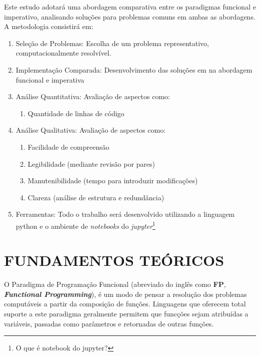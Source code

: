 \documentclass[date,twocolumn,a4paper]{ppgem}
\begin{document}
    Este estudo adotará uma abordagem comparativa entre os paradigmas funcional e imperativo, analisando soluções para problemas comuns em ambas as abordagens. A metodologia consistirá em:
    \begin{enumerate}
        \item Seleção de Problemas: Escolha de um problema representativo, computacionalmente resolvível.
        \item Implementação Comparada: Desenvolvimento das soluções em na abordagem funcional e imperativa
        \item Análise Quantitativa: Avaliação de aspectos como:
        \begin{enumerate}
            \item Quantidade de linhas de código
        \end{enumerate}
        \item Análise Qualitativa: Avaliação de aspectos como:
        \begin{enumerate}
            \item Facilidade de compreensão
            \item Legibilidade (mediante revisão por pares)
            \item Manutenibilidade (tempo para introduzir modificações)
            \item Clareza (análise de estrutura e redundância)
        \end{enumerate}
        \item Ferramentas: Todo o trabalho será desenvolvido utilizando a linguagem python
            e o ambiente de \textit{notebooks} do \textit{jupyter}\footnote{O que é notebook do jupyter?}
    \end{enumerate}


    \section{FUNDAMENTOS TEÓRICOS}
        O Paradigma de Programação Funcional (abreviado do inglês como \textbf{FP}, \textit{\textbf{Functional Programming}}), é um modo de pensar
        a resolução dos problemas computáveis a partir da composição de funções\cite{queiroz_func_prog}.
        Linguagens que oferecem total suporte a este paradigma geralmente permitem que funcções sejam atribuídas a variáveis, passadas como parâmetros
        e retornadas de outras funções.
\end{document}
